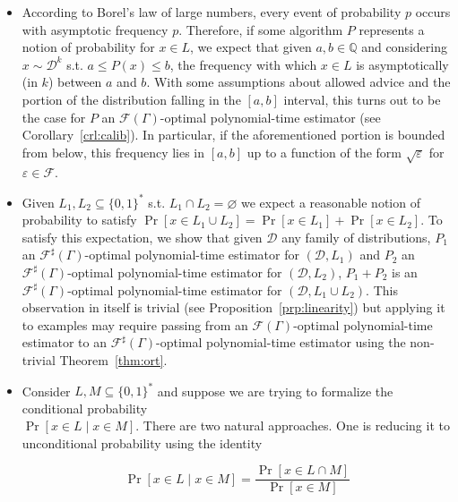 \documentclass{article}
\numberwithin{equation}{section}
\theoremstyle{definition}
\theoremstyle{plain}
\newcommand{\Bool}{\{0,1\}}
\newcommand{\Words}{{\Bool^*}}
\DeclareMathOperator{\Prb}{Pr}
\newcommand{\Rats}{\mathbb{Q}}
\newcommand{\Dist}{\mathcal{D}}
\newcommand{\Fall}{\mathcal{F}}
\newcommand{\EG}{\Fall(\Gamma)}
\newcommand{\ESG}{\Fall^\sharp(\Gamma)}
\begin{document}
\begin{itemize}
\item 
According to Borel's law of large numbers, every event of probability ${p}$ occurs with asymptotic frequency ${p}$. Therefore, if some algorithm ${P}$ represents a notion of probability for ${x \in L}$, we expect that given ${a,b \in \Rats}$ and considering ${x \sim \Dist^k}$ s.t. ${a \leq P(x) \leq b}$, the frequency with which ${x \in L}$ is asymptotically (in ${k}$) between ${a}$ and ${b}$. With some assumptions about allowed advice and the portion of the distribution falling in the ${[a,b]}$ interval, this turns out to be the case for ${P}$ an ${\EG}$-optimal polynomial-time estimator (see Corollary~\ref{crl:calib}). In particular, if the aforementioned portion is bounded from below, this frequency lies in ${[a,b]}$ up to a function of the form ${\sqrt{\varepsilon}}$ for ${\varepsilon \in \Fall}$.
\item
Given ${L_1, L_2 \subseteq \Words}$ s.t. ${L_1 \cap L_2 = \varnothing}$ we expect a reasonable notion of probability to satisfy ${\Prb[x \in L_1 \cup L_2] = \Prb[x \in L_1] + \Prb[x \in L_2]}$. To satisfy this expectation, we show that given ${\Dist}$ any family of distributions, ${P_1}$ an ${\ESG}$-optimal polynomial-time estimator for ${(\Dist,L_1)}$ and ${P_2}$ an ${\ESG}$-optimal polynomial-time estimator for ${(\Dist,L_2)}$, ${P_1 + P_2}$ is an ${\ESG}$-optimal polynomial-time estimator for ${(\Dist, L_1 \cup L_2)}$. This observation in itself is trivial (see Proposition~\ref{prp:linearity}) but applying it to examples may require passing from an ${\EG}$-optimal polynomial-time estimator to an ${\ESG}$-optimal polynomial-time estimator using the non-trivial Theorem~\ref{thm:ort}.
\item
Consider ${L,M \subseteq \Words}$ and suppose we are trying to formalize the conditional probability\\ ${\Prb[x \in L \mid x \in M]}$. There are two natural approaches. One is reducing it to unconditional probability using the identity 

\[\Prb[x \in L \mid x \in M]=\frac{\Prb[x \in L \cap M]}{\Prb[x \in M]}\]


\end{itemize}
\end{document}
